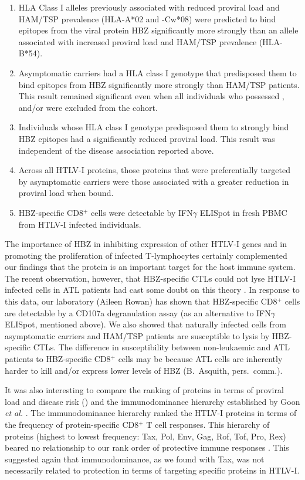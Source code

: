\begin{enumerate}[(1)]
\item HLA Class I alleles previously associated with reduced proviral load and HAM/TSP prevalence (HLA-A*02 and -Cw*08) were predicted to bind epitopes from the viral protein HBZ significantly more strongly than an allele associated with increased proviral load and HAM/TSP prevalence (HLA-B*54).
\item Asymptomatic carriers had a HLA class I genotype that predisposed them to bind epitopes from HBZ significantly more strongly than HAM/TSP patients. This result remained significant even when all individuals who possessed ,  and/or  were excluded from the cohort.
\item Individuals whose HLA class I genotype predisposed them to strongly bind HBZ epitopes had a significantly reduced proviral load. This result was independent of the disease association reported above.
\item Across all HTLV-I proteins, those proteins that were preferentially targeted by asymptomatic carriers were those associated with a greater reduction in proviral load when bound.
\item HBZ-specific CD8$^+$ cells were detectable by IFN$\gamma$ ELISpot in fresh PBMC from HTLV-I infected individuals.
\end{enumerate}

The importance of HBZ in inhibiting expression of other HTLV-I genes \citep{Gaudray2002, Li2009} and in promoting the proliferation of infected T-lymphocytes \citep{Satou2006} certainly complemented our findings that the protein is an important target for the host immune system. The recent observation, however, that HBZ-specific CTLs could not lyse HTLV-I infected cells in ATL patients had cast some doubt on this theory \citep{Suemori2009}. In response to this data, our laboratory (Aileen Rowan) has shown that HBZ-specific CD8$^+$ cells are detectable by a CD107a degranulation assay (as an alternative to IFN$\gamma$ ELISpot, mentioned above). We also showed that naturally infected cells from asymptomatic carriers and HAM/TSP patients are susceptible to lysis by HBZ-specific CTLs. The difference in susceptibility between non-leukaemic and ATL patients to HBZ-specific CD8$^+$ cells may be because ATL cells are inherently harder to kill and/or express lower levels of HBZ (B.~Asquith, pers.~comm.).

It was also interesting to compare the ranking of proteins in terms of proviral load and disease risk () and the immunodominance hierarchy established by Goon \emph{et al.} \citep{Goon2004}. The immunodominance hierarchy ranked the HTLV-I proteins in terms of the frequency of protein-specific CD8$^+$ T cell responses. This hierarchy of proteins (highest to lowest frequency: Tax, Pol, Env, Gag, Rof, Tof, Pro, Rex) beared no relationship to our rank order of protective immune responses . This suggested again that immunodominance, as we found with Tax, was not necessarily related to protection in terms of targeting specific proteins in HTLV-I.   

